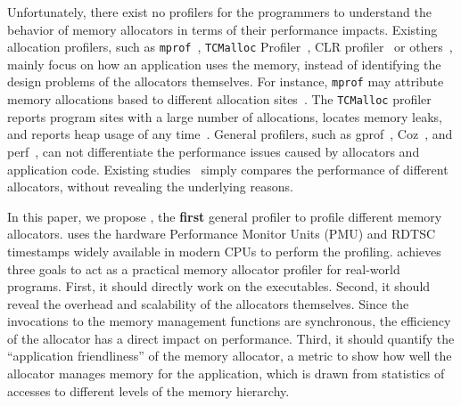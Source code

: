 Unfortunately, there exist no profilers for the programmers to understand the behavior of memory allocators in terms of their performance impacts. Existing allocation profilers, such as \texttt{mprof}~\cite{Zorn:1988:MAP:894814}, \texttt{TCMalloc} Profiler~\cite{tcmalloc-profiler}, CLR profiler~\cite{lupasc2014dynamic} or others~\cite{hirotaka2003developing}, mainly focus on how an application uses the memory,  instead of identifying the design problems of the allocators themselves. For instance, \texttt{mprof} may attribute memory allocations based to different allocation sites~\cite{Zorn:1988:MAP:894814}. The \texttt{TCMalloc} profiler reports program sites with a large number of allocations, locates memory leaks, and reports heap usage of any time~\cite{tcmalloc-profiler}. General profilers, such as gprof~\cite{DBLP:conf/sigplan/GrahamKM82}, Coz~\cite{Coz}, and perf~\cite{perf}, can not differentiate the performance issues caused by allocators and application code. Existing studies~\cite{Barroso:1998:MSC:279358.279363, Masmano:2006:CMA:1167999.1168012, ferreira2011experimental} simply compares the performance of different allocators, without revealing the underlying reasons. 


In this paper, we propose \MP{}, the \textbf{first} general profiler to profile different memory allocators. \MP{} uses the hardware Performance Monitor Units (PMU) and RDTSC timestamps widely available in modern CPUs to perform the profiling. \MP{} achieves three goals to act as a practical memory allocator profiler for real-world programs. First, it should directly work on the executables. Second, it should reveal the overhead and scalability of the allocators themselves. Since the invocations to the memory management functions are synchronous, the efficiency of the allocator has a direct impact on performance. Third, it should quantify the ``application friendliness'' of the memory allocator, a metric to show how well the allocator manages memory for the application, which is drawn from statistics of accesses to different levels of the memory hierarchy.

